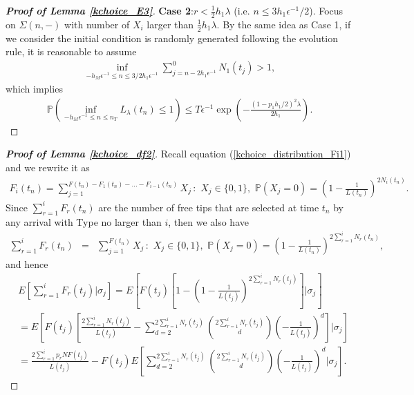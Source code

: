 \documentclass[12pt]{article}
\def\P{\mathbb{P}}
\numberwithin{equation}{section}  %
\begin{document}
\begin{proof}[\textbf{Proof of Lemma \ref{kchoice_E3}}]
\textbf{Case 2}:$r< \frac{1}{2}h_1\lambda$  (i.e. $n\leq 3h_1\epsilon^{-1}/2$). Focus on $\Sigma(n,-)$ with number of $X_i$ larger than $\frac{1}{2}h_1\lambda$. By the same idea as Case 1, if we consider the initial condition is randomly generated following the evolution rule, it is reasonable to assume 
\begin{align*} 
\inf_{-h_M\epsilon^{-1}\leq n\leq 3/2h_1\epsilon^{-1}}\sum_{j=n-2h_1\epsilon^{-1}}^{0} N_1(t_j)>1,
\end{align*} 
which implies
\begin{align*} 
\P\left(\inf_{-h_M\epsilon^{-1}\leq n\leq n_T}L_{\lambda}(t_n)\leq 1\right)\leq T\epsilon^{-1} \exp\left(-\frac{(1-p_1h_1/2)^2\lambda}{2h_1}\right).
\end{align*} 
\end{proof}
\begin{proof}[\textbf{Proof of Lemma \ref{kchoice_df2}}]

Recall equation (\ref{kchoice_distribution_Fi1}) and we rewrite it as
\begin{align*}
F_i(t_n) = \sum_{j=1}^{F(t_n)-F_1(t_n)-...-F_{i-1}(t_n)} X_j\,: \,\, X_j\in \{0,1\}, \,\, \P(X_j=0)=\left(1 - \frac{1}{L(t_n)}\right)^{2 N_i(t_n)}.
\end{align*}
Since $\sum_{r=1}^{i}F_r(t_n)$ are the number of free tips that are selected at time $t_n$ by any arrival with Type no larger than $i$, then we also have 
\begin{align*} 
\sum_{r=1}^{i}F_r(t_n) &=& \sum_{j=1}^{F(t_n)} X_j\,: \,\, X_j\in \{0,1\}, \,\, \P(X_j=0)=\left(1 - \frac{1}{L(t_n)}\right)^{2 \sum_{r=1}^{i}N_r(t_n)},
\end{align*} 
and hence
\begin{align} 
&E\left[\sum_{r=1}^{i}F_r(t_j)\Big|\sigma_{j}\right]
=E\left[F(t_j)\left[1-\left(1-\frac{1}{L(t_j)}\right)^{2\sum_{r=1}^i N_r(t_j)}\right]\Big|\sigma_{j}\right]\label{kchoice_df2_pf_1}\\
&=E\left[F(t_j)\left[\frac{2\sum_{r=1}^i N_r(t_j)}{L(t_j)}-\sum_{d=2}^{2\sum_{r=1}^i N_r(t_j)}{2\sum_{r=1}^i N_r(t_j) \choose d}\left(-\frac{1}{L(t_j)}\right)^d\right]\Big|\sigma_{j}\right]\nonumber\\
&=\frac{2\sum_{r=1}^i p_r N F(t_j)}{L(t_j)}-F(t_j)E\left[\sum_{d=2}^{2\sum_{r=1}^i N_r(t_j)}{2\sum_{r=1}^i N_r(t_j) \choose d}\left(-\frac{1}{L(t_j)}\right)^d\Big|\sigma_{j}\right].\nonumber
\end{align}


\end{proof}
\end{document}
